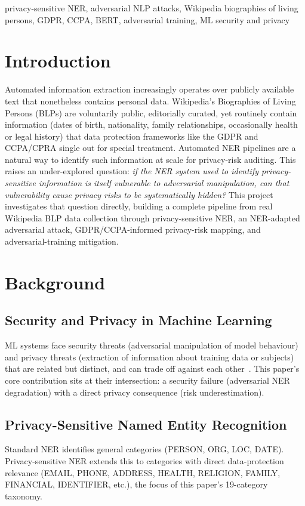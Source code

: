 \documentclass[conference]{IEEEtran}
\begin{document}
\begin{IEEEkeywords}
privacy-sensitive NER, adversarial NLP attacks, Wikipedia biographies of living persons, GDPR, CCPA, BERT, adversarial training, ML security and privacy
\end{IEEEkeywords}

\section{Introduction}
Automated information extraction increasingly operates over publicly available text that nonetheless contains personal data. Wikipedia's Biographies of Living Persons (BLPs) are voluntarily public, editorially curated, yet routinely contain information (dates of birth, nationality, family relationships, occasionally health or legal history) that data protection frameworks like the GDPR and CCPA/CPRA single out for special treatment. Automated NER pipelines are a natural way to identify such information at scale for privacy-risk auditing. This raises an under-explored question: \emph{if the NER system used to identify privacy-sensitive information is itself vulnerable to adversarial manipulation, can that vulnerability cause privacy risks to be systematically hidden?} This project investigates that question directly, building a complete pipeline from real Wikipedia BLP data collection through privacy-sensitive NER, an NER-adapted adversarial attack, GDPR/CCPA-informed privacy-risk mapping, and adversarial-training mitigation.

\section{Background}

\subsection{Security and Privacy in Machine Learning}
ML systems face security threats (adversarial manipulation of model behaviour) and privacy threats (extraction of information about training data or subjects) that are related but distinct, and can trade off against each other~\cite{shokri2017membership}. This paper's core contribution sits at their intersection: a security failure (adversarial NER degradation) with a direct privacy consequence (risk underestimation).

\subsection{Privacy-Sensitive Named Entity Recognition}
Standard NER identifies general categories (PERSON, ORG, LOC, DATE). Privacy-sensitive NER extends this to categories with direct data-protection relevance (EMAIL, PHONE, ADDRESS, HEALTH, RELIGION, FAMILY, FINANCIAL, IDENTIFIER, etc.), the focus of this paper's 19-category taxonomy.
\end{document}
